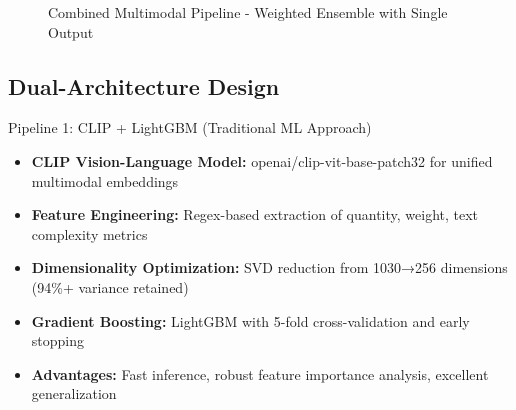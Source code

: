 \documentclass[10pt,a4paper]{article}
\begin{document}
\begin{figure}[H]
\caption{Combined Multimodal Pipeline - Weighted Ensemble with Single Output}
\end{figure}

\subsection{Dual-Architecture Design}

\begin{techbox}{Pipeline 1: CLIP + LightGBM (Traditional ML Approach)}
\begin{itemize}[itemsep=0.2em]
    \item \textbf{CLIP Vision-Language Model:} openai/clip-vit-base-patch32 for unified multimodal embeddings
    \item \textbf{Feature Engineering:} Regex-based extraction of quantity, weight, text complexity metrics
    \item \textbf{Dimensionality Optimization:} SVD reduction from 1030→256 dimensions (94\%+ variance retained)
    \item \textbf{Gradient Boosting:} LightGBM with 5-fold cross-validation and early stopping
    \item \textbf{Advantages:} Fast inference, robust feature importance analysis, excellent generalization
\end{itemize}
\end{techbox}
\end{document}
